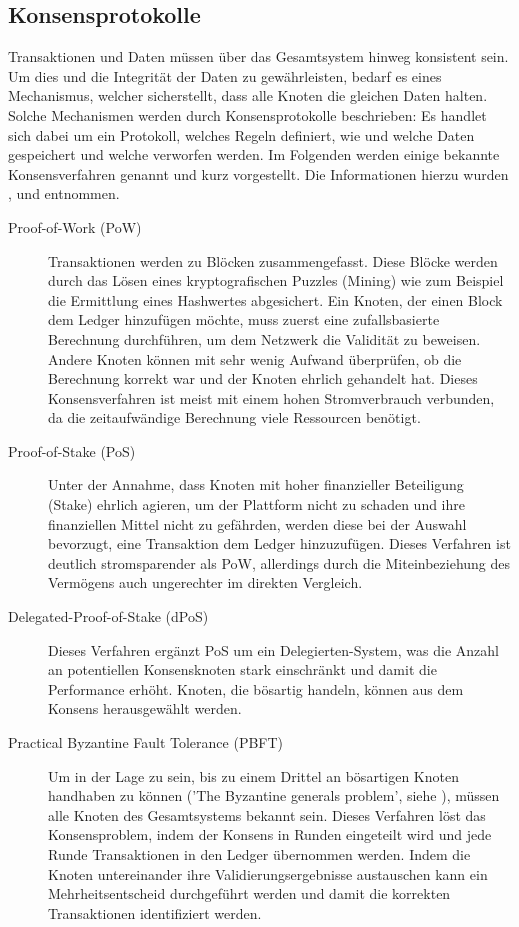 \subsection{Konsensprotokolle}
\label{subsec:fundamentals:dlt:consensus}
Transaktionen und Daten müssen über das Gesamtsystem hinweg konsistent sein. Um dies und die Integrität der Daten zu gewährleisten, bedarf es eines Mechanismus, welcher sicherstellt, dass alle Knoten die gleichen Daten halten. Solche Mechanismen werden durch Konsensprotokolle beschrieben: Es handlet sich dabei um ein Protokoll, welches Regeln definiert, wie und welche Daten gespeichert und welche verworfen werden. Im Folgenden werden einige bekannte Konsensverfahren genannt und kurz vorgestellt. Die Informationen hierzu wurden \cite{Salimitari2018ASO}, \cite{overview2017} und \cite{consensusIOT2018} entnommen.
\begin{description}
  \item[Proof-of-Work (PoW)] Transaktionen werden zu Blöcken zusammengefasst. Diese Blöcke werden durch das Lösen eines kryptografischen Puzzles (Mining) wie zum Beispiel die Ermittlung eines Hashwertes abgesichert. Ein Knoten, der einen Block dem Ledger hinzufügen möchte, muss zuerst eine zufallsbasierte Berechnung durchführen, um dem Netzwerk die Validität zu beweisen. Andere Knoten können mit sehr wenig Aufwand überprüfen, ob die Berechnung korrekt war und der Knoten ehrlich gehandelt hat. Dieses Konsensverfahren ist meist mit einem hohen Stromverbrauch verbunden, da die zeitaufwändige Berechnung viele Ressourcen benötigt.
  \item[Proof-of-Stake (PoS)] Unter der Annahme, dass Knoten mit hoher finanzieller Beteiligung (Stake) ehrlich agieren, um der Plattform nicht zu schaden und ihre finanziellen Mittel nicht zu gefährden, werden diese bei der Auswahl bevorzugt, eine Transaktion dem Ledger hinzuzufügen. Dieses Verfahren ist deutlich stromsparender als PoW, allerdings durch die Miteinbeziehung des Vermögens auch ungerechter im direkten Vergleich.
  \item[Delegated-Proof-of-Stake (dPoS)] Dieses Verfahren ergänzt PoS um ein Delegierten-System, was die Anzahl an potentiellen Konsensknoten stark einschränkt und damit die Performance erhöht. Knoten, die bösartig handeln, können aus dem Konsens herausgewählt werden.
  \item[Practical Byzantine Fault Tolerance (PBFT)] Um in der Lage zu sein, bis zu einem Drittel an bösartigen Knoten handhaben zu können ('The Byzantine generals problem', siehe \cite{byzantine2019}), müssen alle Knoten des Gesamtsystems bekannt sein. Dieses Verfahren löst das Konsensproblem, indem der Konsens in Runden eingeteilt wird und jede Runde Transaktionen in den Ledger übernommen werden. Indem die Knoten untereinander ihre Validierungsergebnisse austauschen kann ein Mehrheitsentscheid durchgeführt werden und damit die korrekten Transaktionen identifiziert werden.

\end{description}
